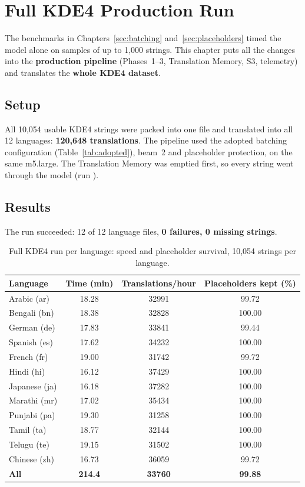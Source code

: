 \section{Full KDE4 Production Run}
\label{sec:kde4run}

The benchmarks in Chapters~\ref{sec:batching} and~\ref{sec:placeholders} timed the model alone on samples of up to 1,000
strings. This chapter puts all the changes into the \textbf{production pipeline} (Phases~1--3, Translation Memory, S3,
telemetry) and translates the \textbf{whole KDE4 dataset}.

\subsection{Setup}
All 10,054 usable KDE4 strings were packed into one  file and translated into all 12 languages:
\textbf{120,648 translations}. The pipeline used the adopted batching configuration (Table~\ref{tab:adopted}), beam~2 and
placeholder protection, on the same m5.large. The Translation Memory was emptied first, so every string went through the
model (run ).

\subsection{Results}
The run succeeded: 12 of 12 language files, \textbf{0 failures, 0 missing strings}.

\begin{table}[H]
\centering
\caption[Full KDE4 run per language: speed]{Full KDE4 run per language: speed and placeholder survival, 10,054 strings per language.}
\label{tab:kde4run}
\begin{tabular}{@{}l S[table-format=2.2] S[table-format=5.0] S[table-format=3.2]@{}}
\toprule
\textbf{Language} & {\textbf{Time (min)}} & {\textbf{Translations/hour}} & {\textbf{Placeholders kept (\%)}} \\
\midrule
Arabic (ar) & 18.28 & 32991 & 99.72 \\
Bengali (bn) & 18.38 & 32828 & 100.00 \\
German (de) & 17.83 & 33841 & 99.44 \\
Spanish (es) & 17.62 & 34232 & 100.00 \\
French (fr) & 19.00 & 31742 & 99.72 \\
Hindi (hi) & 16.12 & 37429 & 100.00 \\
Japanese (ja) & 16.18 & 37282 & 100.00 \\
Marathi (mr) & 17.02 & 35434 & 100.00 \\
Punjabi (pa) & 19.30 & 31258 & 100.00 \\
Tamil (ta) & 18.77 & 32144 & 100.00 \\
Telugu (te) & 19.15 & 31502 & 100.00 \\
Chinese (zh) & 16.73 & 36059 & 99.72 \\
\midrule
\textbf{All} & \bfseries 214.4 & \bfseries 33760 & \bfseries 99.88 \\
\bottomrule
\end{tabular}
\end{table}


